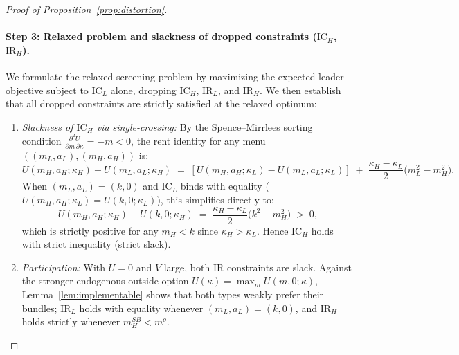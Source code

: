 \documentclass[11pt]{article}
\begin{document}
\begin{proof}[Proof of Proposition~\ref{prop:distortion}]
\paragraph{Step 3: Relaxed problem and slackness of dropped constraints ($\text{IC}_H$, $\text{IR}_H$).}
We formulate the relaxed screening problem by maximizing the expected leader objective subject to $\text{IC}_L$ alone, dropping $\text{IC}_H$, $\text{IR}_L$, and $\text{IR}_H$. We then establish that all dropped constraints are strictly satisfied at the relaxed optimum:
\begin{enumerate}[leftmargin=*]
\item \emph{Slackness of $\text{IC}_H$ via single-crossing:} By the Spence--Mirrlees sorting condition $\frac{\partial^2 U}{\partial m\,\partial \kappa} = -m < 0$, the rent identity for any menu $((m_L, a_L), (m_H, a_H))$ is:
\[
U(m_H, a_H; \kappa_H) - U(m_L, a_L; \kappa_H) \;=\; [U(m_H, a_H; \kappa_L) - U(m_L, a_L; \kappa_L)] \;+\; \frac{\kappa_H - \kappa_L}{2}\big(m_L^2 - m_H^2\big).
\]
When $(m_L, a_L) = (k, 0)$ and $\text{IC}_L$ binds with equality ($U(m_H, a_H; \kappa_L) = U(k, 0; \kappa_L)$), this simplifies directly to:
\[
U(m_H, a_H; \kappa_H) - U(k, 0; \kappa_H) \;=\; \frac{\kappa_H - \kappa_L}{2}\big(k^2 - m_H^2\big) \;>\; 0,
\]
which is strictly positive for any $m_H < k$ since $\kappa_H > \kappa_L$. Hence $\text{IC}_H$ holds with strict inequality (strict slack).
\item \emph{Participation:} With $\underline{U} = 0$ and $V$ large, both IR constraints are slack. Against the stronger endogenous outside option $\underline{U}(\kappa) = \max_{m} U(m,0;\kappa)$, Lemma~\ref{lem:implementable} shows that both types weakly prefer their bundles; $\text{IR}_L$ holds with equality whenever $(m_L, a_L) = (k,0)$, and $\text{IR}_H$ holds strictly whenever $m_H^{SB} < m^o$.
\end{enumerate}


\end{proof}
\end{document}
